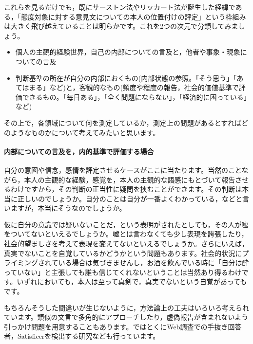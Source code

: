 \documentclass{ltjsbook}
\begin{document}
これらを見るだけでも，既にサーストン法やリッカート法が誕生した経緯である，「態度対象に対する意見文についての本人の位置付けの評定」という枠組みは大きく飛び越えていることは明らかです。これを2つの次元で分類してみましょう。
\begin{itemize}
    \item 個人の主観的経験世界，自己の内部についての言及と，他者や事象・現象についての言及
    \item 判断基準の所在が自分の内部におくもの(内部状態の参照。「そう思う」「あてはまる」など)と，客観的なもの(頻度や程度の報告，社会的価値基準で評価できるもの。「毎日ある」，「全く問題にならない」，「経済的に困っている」など)
\end{itemize}
その上で，各領域について何を測定しているか，測定上の問題があるとすればどのようなものかについて考えてみたいと思います。
\paragraph{内部についての言及を，内的基準で評価する場合}
自分の意図や信念，感情を評定させるケースがここに当たります。当然のことながら，本人の主観的な経験，感覚を，本人の主観的な語感にもとづいて報告させるわけですから，その判断の正当性に疑問を挟むことができます。その判断は本当に正しいのでしょうか。自分のことは自分が一番よくわかっている，などと言いますが，本当にそうなのでしょうか。

仮に自分の意識では疑いないことだ，という表明がされたとしても，その人が嘘をついてないといえるでしょうか。嘘とは言わなくても少し表現を誇張したり，社会的望ましさを考えて表現を変えてないといえるでしょうか。さらにいえば，真実でないことを自覚しているかどうかという問題もあります。社会的状況にプライミングされている場合は気づきませんし，お酒を飲んでいる時に「自分は酔っていない」と主張しても誰も信じてくれないということは当然あり得るわけです。いずれにおいても，本人は至って真剣で，真実でないという自覚があってもです。

もちろんそうした間違いが生じないように，方法論上の工夫はいろいろ考えられています。類似の文言で多角的にアプローチしたり，虚偽報告が含まれないよう引っかけ問題を用意することもあります。\citet{MiuraAsako2015}ではとくにWeb調査での手抜き回答者，Satisficerを検出する研究なども行っています。
\end{document}
